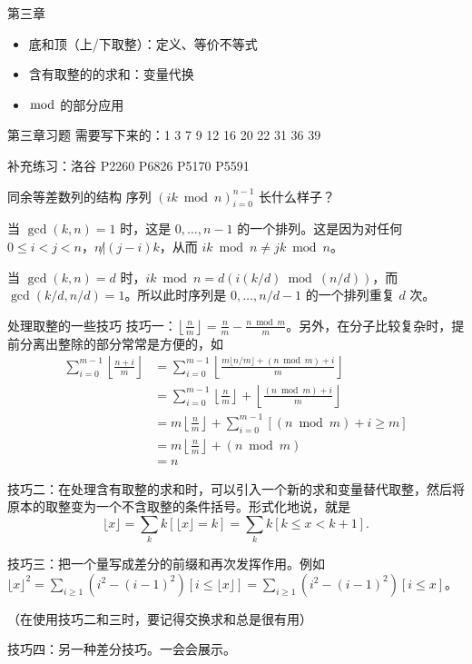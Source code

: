
\begin{frame}{第三章}
    \begin{itemize}
        \item 底和顶（上/下取整）：定义、等价不等式
        \item 含有取整的的求和：变量代换
        \item $\bmod$ 的部分应用
    \end{itemize}
\end{frame}
\begin{frame}{第三章习题}
    需要写下来的：1 3 7 9 12 16 20 22 31 36 39 

    补充练习：洛谷 P2260 P6826 P5170 P5591 

\end{frame}
\begin{frame}{同余等差数列的结构}
    序列 $(ik\bmod n)_{i=0}^{n-1}$ 长什么样子？

    当 $\gcd(k,n)=1$ 时，这是 $0,\ldots,n-1$ 的一个排列。这是因为对任何 $0\le i<j<n$，$n\not|(j-i)k$，从而 $ik\bmod n\ne jk\bmod n$。

    当 $\gcd(k,n)=d$ 时，$ik\bmod n=d(i(k/d)\bmod (n/d))$，而 $\gcd(k/d,n/d)=1$。所以此时序列是 $0,\ldots,n/d-1$ 的一个排列重复 $d$ 次。
\end{frame}
\begin{frame}{处理取整的一些技巧}
    技巧一：$\left\lfloor\frac{n}{m}\right\rfloor=\frac{n}{m}-\frac{n\bmod m}{m}$。另外，在分子比较复杂时，提前分离出整除的部分常常是方便的，如
    $$
    \begin{aligned}
    \sum_{i=0}^{m-1}\left\lfloor\frac{n+i}{m}\right\rfloor&=\sum_{i=0}^{m-1}\left\lfloor\frac{m\lfloor n/m\rfloor+(n\bmod m)+i}{m}\right\rfloor\\
    &=\sum_{i=0}^{m-1}\left\lfloor\frac{n}{m}\right\rfloor+\left\lfloor\frac{(n\bmod m)+i}{m}\right\rfloor\\
    &=m\left\lfloor\frac{n}{m}\right\rfloor+\sum_{i=0}^{m-1}[(n\bmod m)+i\ge m]\\
    &=m\left\lfloor\frac{n}{m}\right\rfloor+(n\bmod m)\\
    &=n
    \end{aligned}
    $$
\end{frame}
\begin{frame}
    技巧二：在处理含有取整的求和时，可以引入一个新的求和变量替代取整，然后将原本的取整变为一个不含取整的条件括号。形式化地说，就是
    $$
    \lfloor x\rfloor=\sum_k k[\lfloor x\rfloor=k]=\sum_k k[k\le x<k+1].
    $$

    技巧三：把一个量写成差分的前缀和再次发挥作用。例如 $\lfloor x\rfloor^2=\sum_{i\ge 1}(i^2-(i-1)^2)[i\le \lfloor x\rfloor]=\sum_{i\ge 1}(i^2-(i-1)^2)[i\le x]$。

    （在使用技巧二和三时，要记得交换求和总是很有用）

    技巧四：另一种差分技巧。一会会展示。
\end{frame}
